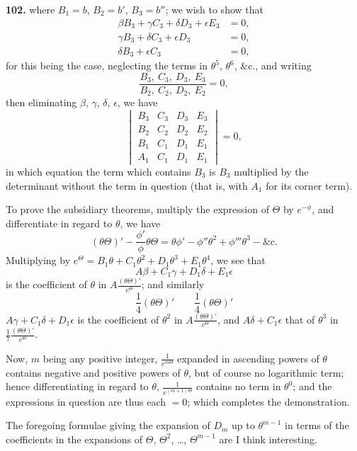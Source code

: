 \documentclass[11pt,a4paper]{book}
\begin{document}
\noindent\textbf{102.} where $B_1 = b$, $B_2 = b'$, $B_3 = b''$; we wish to show that
\begin{align*}
\beta B_3 + \gamma C_3 + \delta D_3 + \epsilon E_3 &= 0, \\
\gamma B_3 + \delta C_3 + \epsilon D_3 &= 0, \\
\delta B_3 + \epsilon C_3 &= 0,
\end{align*}
for this being the case, neglecting the terms in $\theta^5$, $\theta^6$, \&c., and writing
\[
\frac{B_3,\ C_3,\ D_3,\ E_3}{B_2,\ C_2,\ D_2,\ E_2} = 0,
\]
then eliminating $\beta$, $\gamma$, $\delta$, $\epsilon$, we have
\[
\begin{vmatrix}
B_3 & C_3 & D_3 & E_3 \\
B_2 & C_2 & D_2 & E_2 \\
B_1 & C_1 & D_1 & E_1 \\
A_1 & C_1 & D_1 & E_1
\end{vmatrix} = 0,
\]
in which equation the term which contains $B_3$ is $B_3$ multiplied by the determinant without the term in question (that is, with $A_1$ for its corner term).

To prove the subsidiary theorems, multiply the expression of $\Theta$ by $e^{-\phi}$, and differentiate in regard to $\theta$, we have
\[
(\theta\Theta)' - \frac{\phi'}{\phi}\theta\Theta = \theta\phi' - \phi''\theta^2 + \phi'''\theta^3 - \&\text{c.}
\]
Multiplying by $e^{\Theta} = B_1\theta + C_1\theta^2 + D_1\theta^3 + E_1\theta^4$, we see that
\[
A\beta + C_1\gamma + D_1\delta + E_1\epsilon
\]
is the coefficient of $\theta$ in $A\frac{(\theta\Theta)'}{e^{\Theta}}$; and similarly
\[
\frac{1}{4}(\theta\Theta)' \qquad \frac{1}{4}(\theta\Theta)'
\]
$A\gamma + C_1\delta + D_1\epsilon$ is the coefficient of $\theta^2$ in $A\frac{(\theta\Theta)'}{e^{\Theta}}$, and $A\delta + C_1\epsilon$ that of $\theta^3$ in $\frac{1}{7}\frac{(\theta\Theta)'}{e^{\Theta}}$.

Now, $m$ being any positive integer, $\frac{1}{e^{m\Theta}}$ expanded in ascending powers of $\theta$ contains negative and positive powers of $\theta$, but of course no logarithmic term; hence differentiating in regard to $\theta$, $\frac{1}{e^{(m+1)\Theta}}$ contains no term in $\theta^0$; and the expressions in question are thus each $= 0$; which completes the demonstration.

The foregoing formulae giving the expansion of $D_m$ up to $\theta^{m-1}$ in terms of the coefficients in the expansions of $\Theta$, $\Theta^2$, \dots, $\Theta^{m-1}$ are I think interesting.
\end{document}
